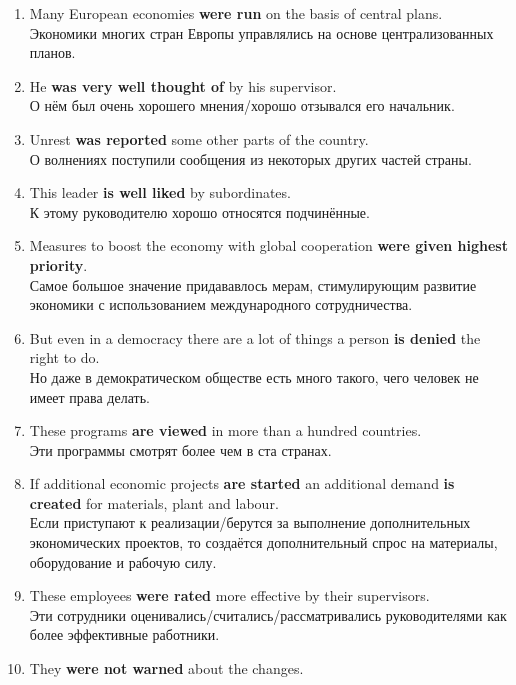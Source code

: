 \documentclass[main.tex]{subfiles}
\begin{document}

\begin{enumerate}[nosep,leftmargin=*]
	\item Many European economies \textbf{were run} on the basis of central plans.\\
	Экономики многих стран Европы управлялись на основе централизованных планов.
	\item He \textbf{was very well thought of} by his supervisor.\\
	О нём был очень хорошего мнения/хорошо отзывался его начальник.
	\item Unrest \textbf{was reported} some other parts of the country.\\
	О волнениях поступили сообщения из некоторых других частей страны.
	\item This leader \textbf{is well liked} by subordinates.\\
	К этому руководителю хорошо относятся подчинённые.
	\item Measures to boost the economy with global cooperation \textbf{were given highest priority}.\\
	Самое большое значение придававлось мерам, стимулирующим развитие экономики с использованием международного сотрудничества.
	\item But even in a democracy there are a lot of things a person \textbf{is denied} the right to do.\\
	Но даже в демократическом обществе есть много такого, чего человек не имеет права делать.
	\item These programs \textbf{are viewed} in more than a hundred countries.\\
	Эти программы смотрят более чем в ста странах.
	\item If additional economic projects \textbf{are started} an additional demand \textbf{is created} for materials, plant and labour.\\
	Если приступают к реализации/берутся за выполнение дополнительных экономических проектов, то создаётся дополнительный спрос на материалы, оборудование и рабочую силу.
	\item These employees \textbf{were rated} more effective by their supervisors.\\
	Эти сотрудники оценивались/считались/рассматривались руководителями как более эффективные работники.
	\item They \textbf{were not warned} about the changes.\\

\end{enumerate}
\end{document}
